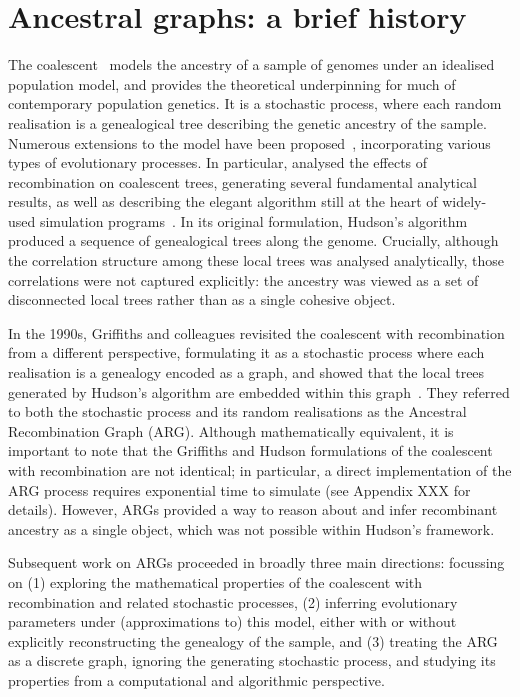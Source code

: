 \documentclass{article}
\begin{document}
\section*{Ancestral graphs: a brief history}
The coalescent~\citep{kingman1982coalescent,kingman1982genealogy,
hudson1983testing, tajima1983evolutionary} models the ancestry of a sample of
genomes under an idealised population model, and provides the theoretical
underpinning for much of contemporary population genetics.
It is a stochastic process, where each random realisation
is a genealogical tree describing the genetic ancestry of the sample.
Numerous extensions to the model have been proposed~\citep{hudson1990gene,hein2004gene,wakely2008coalescent}, incorporating various types of evolutionary processes.
In particular, \citet{hudson1983properties}
analysed the effects of recombination on coalescent trees, generating several fundamental analytical results,
as well as describing the elegant algorithm
still at the heart of widely-used simulation
programs~\citep{hudson2002generating,kelleher2016efficient,baumdicker2021efficient}.
In its original formulation, Hudson's algorithm produced a
sequence of genealogical trees along the genome.
Crucially, although the correlation structure among these
local trees was analysed analytically, those correlations
were not captured explicitly: the ancestry
was viewed as a set of disconnected local trees rather than
as a single cohesive object.

In the 1990s, Griffiths and colleagues revisited the
coalescent with recombination from a different perspective,
formulating it as a stochastic process where each realisation
is a genealogy encoded as a graph,
and showed that the local trees generated by Hudson's algorithm
are embedded within this graph~\citep{griffiths1991two,ethier1990two,griffiths1996ancestral,griffiths1997ancestral}.
They referred to both the stochastic process and
its random realisations as the Ancestral Recombination Graph (ARG).
Although mathematically equivalent, it is
important to note that the Griffiths and Hudson formulations of
the coalescent with recombination are not identical;
in particular, a direct implementation of the ARG process
requires exponential time to simulate
(see Appendix XXX for details). However, ARGs provided a way
to reason about and infer recombinant ancestry as a single object,
which was not possible within Hudson's framework.

Subsequent work on ARGs proceeded in broadly three main directions: focussing on (1)
exploring the mathematical properties of the coalescent with recombination and
related stochastic processes, (2) inferring evolutionary parameters under
(approximations to) this model, either with or without explicitly reconstructing the
genealogy of the sample, and (3) treating the ARG as a discrete graph, ignoring the
generating stochastic process, and studying its properties from a computational and
algorithmic perspective.
\end{document}
